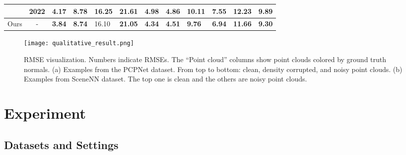 \documentclass[sigconf]{acmart}
\begin{document}
\begin{table*}[t]
\begin{tabular}{@{}l|c|lllllll|lll@{}}
        & 2022
        &  4.17    
        &      8.78  
        &       16.25
        & \multicolumn{1}{l|}{21.61}      
        &         4.98
        & \multicolumn{1}{l|}{4.86}         
        &                         10.11                      
        &                              7.55              
        & \multicolumn{1}{l|}{12.23}                       
        &                          9.89                    
        \\
        \midrule
        Ours 
        & -
        & \textbf{3.84}
        &     \textbf{8.74}   
        &       16.10
        & \multicolumn{1}{l|}{\textbf{21.05}}      
        &         \textbf{4.34}
        & \multicolumn{1}{l|}{\textbf{4.51}}         
        &                         \textbf{9.76}                      
        &                             \textbf{6.94}               
        & \multicolumn{1}{l|}{\textbf{11.66}}                       
        &                          \textbf{9.30}                    
        \\
        \bottomrule
        
    \end{tabular}
    \label{tab: pcpnet result}
\end{table*} 
\begin{figure*}[t]
  \centering
  \texttt{[image: qualitative\_result.png]}
  \caption{RMSE visualization. Numbers indicate RMSEs. The ``Point cloud'' columns show point clouds colored by ground truth normals. (a) Examples from the PCPNet dataset. From top to bottom: clean, density corrupted, and noisy point clouds. (b) Examples from SceneNN dataset. The top one is clean and the others are noisy point clouds.}
  \label{fig: error visualizations}
\end{figure*}





\section{Experiment}

\subsection{Datasets and Settings}
\end{document}
